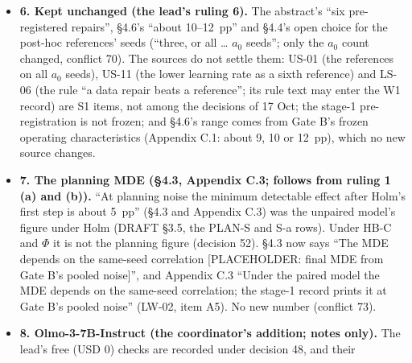\documentclass{article}
\theoremstyle{plain}
\theoremstyle{definition}
\theoremstyle{remark}
\begin{document}
\begin{itemize}
{        5).} ``Each answer is clipped to its first 512 classifier tokens before
        it is judged, as HarmBench's own evaluation script does, so \ldots{}''
        $\to$ ``\ldots{} before it is judged, so the classifier reads only the
        opening of a longer answer. The clip mirrors HarmBench's own evaluation
        script (\nolinkurl{evaluate_completions.py}): tokens are counted with
        the classifier's own tokenizer, loaded from the classifier's model
        snapshot; the count of 512 includes the beginning-of-sequence token; the
        answer is truncated on the right and decoded without special tokens.''
        Checked on the script and on the Gate B pipeline (CITE-CHECK 36). No
        path or hash in the paper; the script is named by its public file name
        (conflict 75).
  \item \textbf{6. Kept unchanged (the lead's ruling 6).} The abstract's ``six
        pre-registered repairs'', \S{}4.6's ``about 10--12~pp'' and \S{}4.4's
        open choice for the post-hoc references' seeds (``three, or all \ldots{}
        $a_0$ seeds''; only the $a_0$ count changed, conflict 70). The sources
        do not settle them: US-01 (the references on all $a_0$ seeds), US-11
        (the lower learning rate as a sixth reference) and LS-06 (the rule ``a
        data repair beats a reference''; its rule text may enter the W1 record)
        are S1 items, not among the decisions of 17 Oct; the stage-1
        pre-registration is not frozen; and \S{}4.6's range comes from Gate B's
        frozen operating characteristics (Appendix C.1: about 9, 10 or 12~pp),
        which no new source changes.
  \item \textbf{7. The planning MDE (\S{}4.3, Appendix C.3; follows from ruling
        1 (a) and (b)).} ``At planning noise the minimum detectable effect after
        Holm's first step is about 5~pp'' (\S{}4.3 and Appendix C.3) was the
        unpaired model's figure under Holm (DRAFT \S{}3.5, the PLAN-S and S-a
        rows). Under HB-C and $\Phi$ it is not the planning figure (decision
        52). \S{}4.3 now says ``The MDE depends on the same-seed correlation
        [PLACEHOLDER: final MDE from Gate B's pooled noise]'', and Appendix C.3
        ``Under the paired model the MDE depends on the same-seed correlation;
        the stage-1 record prints it at Gate B's pooled noise'' (LW-02, item
        A5). No new number (conflict 73).
  \item \textbf{8. Olmo-3-7B-Instruct (the coordinator's addition; notes only).}
        The lead's free (USD 0) checks are recorded under decision 48, and their

\end{itemize}
\end{document}

